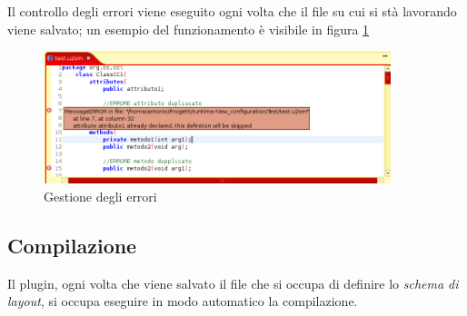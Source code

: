 Il controllo degli errori viene eseguito ogni volta che il file su cui si stà lavorando
viene salvato; un esempio del funzionamento è visibile in figura \ref{errorieditor}

\begin{figure}[htp]
\begin{center}
  \includegraphics[width=0.9\textwidth]{img/errori_editor.png}
  \caption[labelInTOC]{Gestione degli errori}
  \label{errorieditor} 
\end{center}
\end{figure} 

\subsection{Compilazione} 
Il plugin, ogni volta che viene salvato il file che si occupa di definire lo
\emph{schema di layout}, si occupa eseguire in modo automatico la compilazione.
